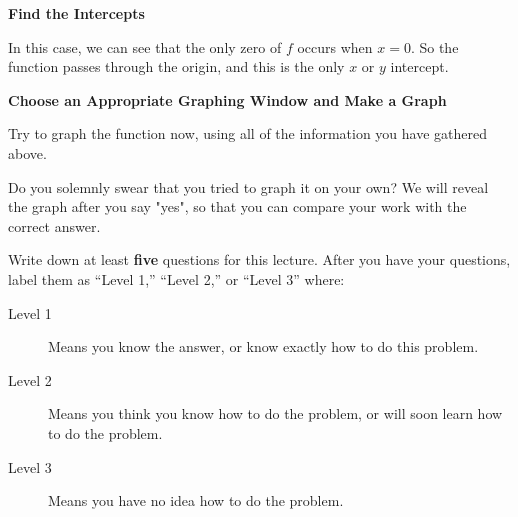 \documentclass{ximera}
\begin{document}
\begin{question}
  \textbf{Find the Intercepts}
  
  In this case, we can see that the only zero of $f$ occurs when $x=0$.  So the function passes through the origin, and this is the only $x$ or $y$ intercept.
  
  \textbf{Choose an Appropriate Graphing Window and Make a Graph}
  
  Try to graph the function now, using all of the information you have gathered above.  
  
  
  \begin{solution}
  
  Do you solemnly swear that you tried to graph it on your own?  We will reveal the graph after you say "yes", so that you can compare your work with the correct answer.
  
  	\begin{multipleChoice}
    \end{multipleChoice}

  \end{solution}
 
\begin{image}
\end{image}

  
\end{question}

Write down at least \textbf{five} questions for this lecture. After
you have your questions, label them as ``Level 1,'' ``Level 2,'' or ``Level 3'' where:
\begin{description}
\item[Level 1] Means you know the answer, or know exactly how to do this problem.
\item[Level 2] Means you think you know how to do the problem, or will soon learn how to do the problem.
\item[Level 3] Means you have no idea how to do the problem. 
\end{description}
\begin{question}
  \begin{freeResponse}
  \end{freeResponse}
\end{question}
\end{document}

